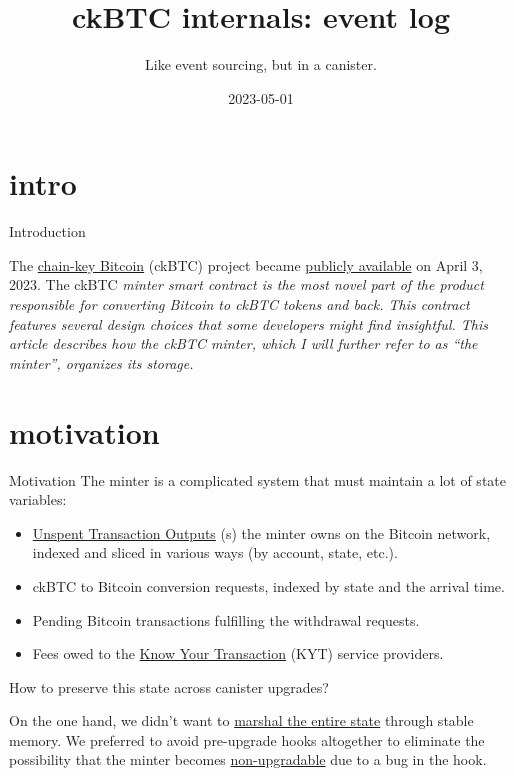 \documentclass{article}
\title{ckBTC internals: event log}
\subtitle{Like event sourcing, but in a canister.}
\date{2023-05-01}
\begin{document}
\section{intro}{Introduction}
  
The \href{https://medium.com/dfinity/chain-key-bitcoin-a-decentralized-bitcoin-twin-ceb8f4ddf95e}{chain-key Bitcoin} (ckBTC) project became \href{https://twitter.com/dfinity/status/1642887821731004418}{publicly available} on April 3, 2023.
The ckBTC \em{minter} smart contract is the most novel part of the product responsible for converting Bitcoin to ckBTC tokens and back.
This contract features several design choices that some developers might find insightful.
This article describes how the ckBTC minter, which I will further refer to as ``the minter'', organizes its storage.

\section{motivation}{Motivation}
The minter is a complicated system that must maintain a lot of state variables:

\begin{itemize}
    \item
    \href{https://en.wikipedia.org/wiki/Unspent_transaction_output}{Unspent Transaction Outputs} (s) the minter owns on the Bitcoin network, indexed and sliced in various ways (by account, state, etc.).
    \item
    ckBTC to Bitcoin conversion requests, indexed by state and the arrival time.
    \item
    Pending Bitcoin transactions fulfilling the withdrawal requests.
    \item
    Fees owed to the \href{https://thepaypers.com/expert-opinion/know-your-transaction-kyt-the-key-to-combating-transaction-laundering--1246231}{Know Your Transaction} (KYT) service providers.
\end{itemize}

How to preserve this state across canister upgrades?

On the one hand, we didn't want to \href{/posts/11-ii-stable-memory.html#conventional-memory-management}{marshal the entire state} through stable memory.
We preferred to avoid pre-upgrade hooks altogether to eliminate the possibility that the minter becomes \href{/posts/01-effective-rust-canisters.html#upgrade-hook-panics}{non-upgradable} due to a bug in the hook.
\end{document}
